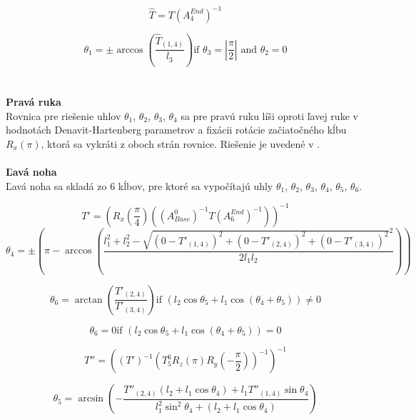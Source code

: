 $$\widehat{T} = T\left(A_4^{End}\right)^{-1}$$

\begin{equation}
	\theta_1 = \pm \arccos\left(\frac{\widehat{T}_{\left(1,4\right)}}{l_3}\right)
	\text{if }\theta_3 = \left|\frac{\pi}{2}\right|\text{ and }\theta_2 = 0
\end{equation}
\\\\
\textbf{Pravá ruka}\\
	Rovnica pre riešenie uhlov $\theta_1$, $\theta_2$, $\theta_3$, $\theta_4$ sa pre pravú ruku líši oproti ľavej ruke v hodnotách Denavit-Hartenberg parametrov a fixácii rotácie začiatočného kĺbu $R_x(\pi)$, ktorá sa vykráti z oboch strán rovnice. Riešenie je uvedené v \cite{kofinas_master}.
\\\\
\textbf{Ľavá noha}
\\Ľavá noha sa skladá zo 6 kĺbov, pre ktoré sa vypočítajú uhly $\theta_1$, $\theta_2$, $\theta_3$, $\theta_4$, $\theta_5$, $\theta_6$.

$$T'=\left(R_x\left(\frac{\pi}{4}\right) \left(\left(A_{Base}^0\right)^{-1}T\left(A_6^{End}\right)^{-1} \right) \right)^{-1}$$
\begin{equation}
	\theta_4 = \pm \left(\pi - \arccos\left(\frac{l_1^2 + l_2^2 - \sqrt{\left(0-T'_{\left(1,4\right)}\right)^2 + \left(0-T'_{\left(2,4\right)}\right)^2 + \left(0-T'_{\left(3,4\right)}\right)^2}^2 }{2l_1l_2}\right)\right)
\end{equation}

\begin{equation}
	\theta_6 = \arctan\left(\frac{T'_{\left(2,4\right)}}{T'_{\left(3,4\right)}}\right)
	\text{if }\left(l_2\cos\theta_5 + l_1\cos\left(\theta_4 + \theta_5\right)\right) \neq 0
\end{equation}

\begin{equation}
	\theta_6 = 0
	\text{if }\left(l_2\cos\theta_5 + l_1\cos\left(\theta_4 + \theta_5\right)\right) = 0 
\end{equation}

$$T''=\left(\left(T'\right)^{-1} \left(T_5^6 R_z\left(\pi\right) R_y\left(-\frac{\pi}{2}\right)\right)^{-1}\right)^{-1}$$

\begin{equation}
	\theta_5 = \arcsin\left(-\frac{T''_{\left(2,4\right)} \left(l_2 + l_1\cos\theta_4\right) + l_1T''_{\left(1,4\right)}\sin\theta_4 } {l_1^2\sin^2 \theta_4 + \left(l_2 + l_1\cos\theta_4\right) }\right)
\end{equation}

